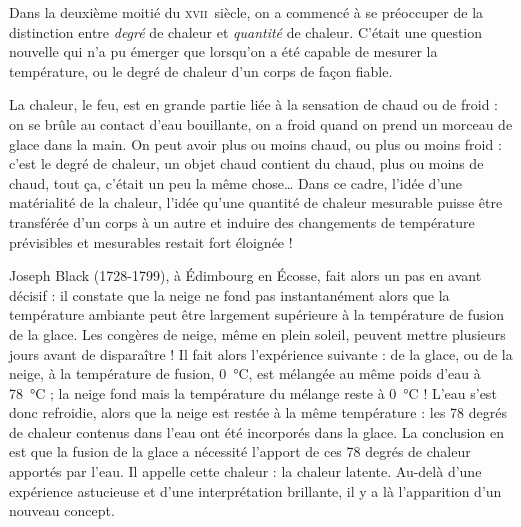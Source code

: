 \atstartofhistorysection
{}
\label{ch_histoire_quantite_chaleur_depondt}


	Dans la deuxième moitié du \textsc{xvii}\ieme\ siècle, on a commencé à se préoccuper de la distinction entre \emph{degré} de chaleur et \emph{quantité} de chaleur. C'était une question nouvelle qui n'a pu émerger que lorsqu'on a été capable de mesurer la température, ou le degré de chaleur d'un corps de façon fiable.

	La chaleur, le feu, est en grande partie liée à la sensation de chaud ou de froid : on se brûle au contact d'eau bouillante, on a froid quand on prend un morceau de glace dans la main. On peut avoir plus ou moins chaud, ou plus ou moins froid : c'est le degré de chaleur, un objet chaud contient du chaud, plus ou moins de chaud, tout ça, c'était un peu la même chose… Dans ce cadre, l'idée d'une matérialité de la chaleur, l'idée qu'une quantité de chaleur mesurable puisse être transférée d'un corps à un autre et induire des changements de température prévisibles et mesurables restait fort éloignée !

	Joseph Black (1728-1799), à Édimbourg en Écosse, fait alors un pas en avant décisif : il constate que la neige ne fond pas instantanément alors que la température ambiante peut être largement supérieure à la température de fusion de la glace. Les congères de neige, même en plein soleil, peuvent mettre plusieurs jours avant de disparaître ! Il fait alors l'expérience suivante : de la glace, ou de la neige, à la température de fusion, \SI{0}{\degreeCelsius}, est mélangée au même poids d'eau à \SI{78}{\degreeCelsius} ; la neige fond mais la température du mélange reste à \SI{0}{\degreeCelsius} ! L'eau s'est donc refroidie, alors que la neige est restée à la même température : les 78 degrés de chaleur contenus dans l'eau ont été incorporés dans la glace. La conclusion en est que la fusion de la glace a nécessité l'apport de ces 78 degrés de chaleur apportés par l'eau. Il appelle cette chaleur : la chaleur latente. Au-delà d'une expérience astucieuse et d'une interprétation brillante, il y a là l'apparition d'un nouveau concept.

